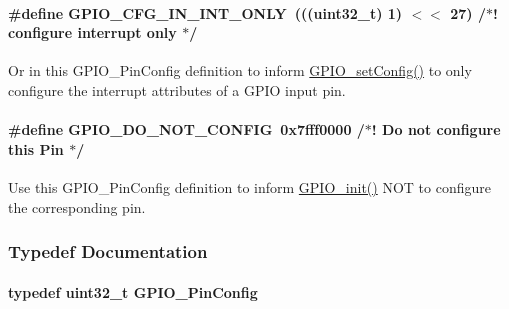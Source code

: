\paragraph[{G\+P\+I\+O\+\_\+\+C\+F\+G\+\_\+\+I\+N\+\_\+\+I\+N\+T\+\_\+\+O\+N\+L\+Y}]{\setlength{\rightskip}{0pt plus 5cm}\#define G\+P\+I\+O\+\_\+\+C\+F\+G\+\_\+\+I\+N\+\_\+\+I\+N\+T\+\_\+\+O\+N\+L\+Y~(((uint32\+\_\+t) 1) $<$$<$ 27)                  /$\ast$! configure interrupt only $\ast$/}\label{_g_p_i_o_8h_ac8df4b49e09cb612275ed7d00e8cc1cf}


\textquotesingle{}Or\textquotesingle{} in this G\+P\+I\+O\+\_\+\+Pin\+Config definition to inform \hyperlink{_g_p_i_o_8h_ae13b9ae70c5d2993d1ac932a91c1f1fa}{G\+P\+I\+O\+\_\+set\+Config()} to only configure the interrupt attributes of a G\+P\+I\+O input pin. 

\paragraph[{G\+P\+I\+O\+\_\+\+D\+O\+\_\+\+N\+O\+T\+\_\+\+C\+O\+N\+F\+I\+G}]{\setlength{\rightskip}{0pt plus 5cm}\#define G\+P\+I\+O\+\_\+\+D\+O\+\_\+\+N\+O\+T\+\_\+\+C\+O\+N\+F\+I\+G~0x7fff0000                              /$\ast$! Do not configure this Pin $\ast$/}\label{_g_p_i_o_8h_a0974eb3af57b7bccef9ac749d4cf23a7}


Use this G\+P\+I\+O\+\_\+\+Pin\+Config definition to inform \hyperlink{_g_p_i_o_8h_a7aaec489dca5ac4d278d2eb3ae38a2d2}{G\+P\+I\+O\+\_\+init()} N\+O\+T to configure the corresponding pin. 



\subsubsection{Typedef Documentation}
\paragraph[{G\+P\+I\+O\+\_\+\+Pin\+Config}]{\setlength{\rightskip}{0pt plus 5cm}typedef uint32\+\_\+t {\bf G\+P\+I\+O\+\_\+\+Pin\+Config}}\label{_g_p_i_o_8h_a7f5d979226db633309b3fdc0f4a8aef6}


